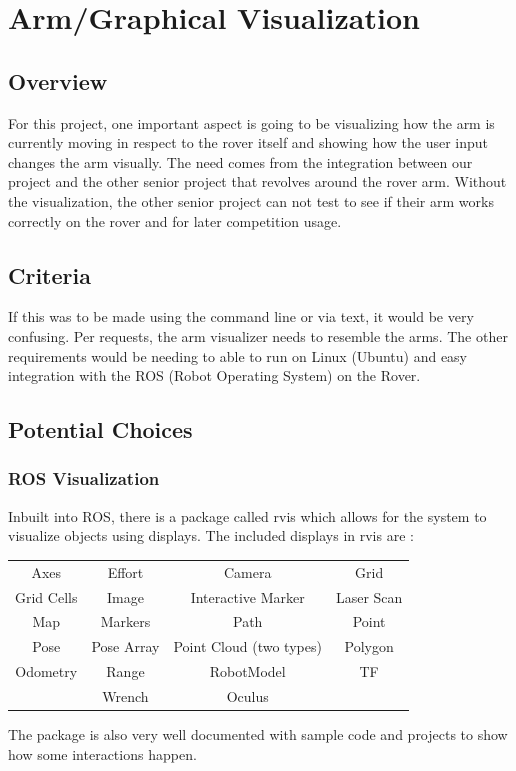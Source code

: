 \documentclass[onecolumn, draftclsnofoot, 10pt, compsoc]{IEEEtran}
\begin{document}
\section{Arm/Graphical Visualization}
\subsection{Overview}
For this project, one important aspect is going to be visualizing how the arm is currently moving in respect to the rover itself and showing how the user input changes the arm visually.
The need comes from the integration between our project and the other senior project that revolves around the rover arm.
Without the visualization, the other senior project can not test to see if their arm works correctly on the rover and for later competition usage. 

\subsection{Criteria}
If this was to be made using the command line or via text, it would be very confusing.
Per requests, the arm visualizer needs to resemble the arms.
The other requirements would be needing to able to run on Linux (Ubuntu) and easy integration with the ROS (Robot Operating System) on the Rover. 

\subsection{Potential Choices}
\subsubsection{ROS Visualization}
Inbuilt into ROS, there is a package called rvis which allows for the system to visualize objects using displays.
The included displays in rvis are \cite{rvis}:
\begin{center}
\begin{tabular}{c c c c}
Axes & Effort & Camera & Grid \\
Grid Cells & Image & Interactive Marker & Laser Scan \\
Map & Markers & Path & Point \\
Pose & Pose Array & Point Cloud (two types) & Polygon \\
Odometry & Range & RobotModel & TF \\
& Wrench & Oculus & \\
\end{tabular}
\end{center}
The package is also very well documented with sample code and projects to show how some interactions happen.
\end{document}
